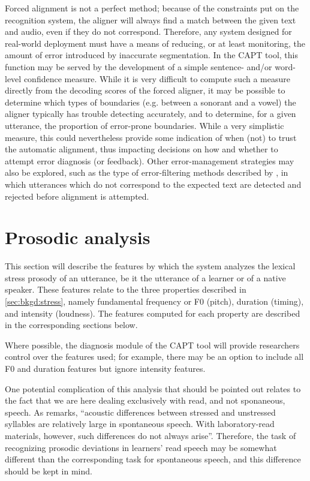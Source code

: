 	Forced alignment is not a perfect method; because of the constraints put on the recognition system, the aligner will always find a match between the given text and audio, even if they do not correspond. Therefore, any system designed for real-world deployment must have a means of reducing, or at least monitoring, the amount of error introduced by inaccurate segmentation. 	
	In the CAPT tool, this function may be served by the development of a simple sentence- and/or word-level confidence measure. 
	While it is very difficult to compute such a measure directly from the decoding scores of the forced aligner, it may be possible to determine which types of boundaries (e.g. between a sonorant and a vowel) the aligner typically has trouble detecting accurately, and to determine, for a given utterance, the proportion of error-prone boundaries. While a very simplistic measure, this could nevertheless provide some indication of when (not) to trust the automatic alignment, thus impacting decisions on how and whether to attempt error diagnosis (or feedback).
	Other error-management strategies may also be explored, such as the type of error-filtering methods described by \textcite{Mesbahi2011,Bonneau2012,Orosanu2012}, in which utterances which do not correspond to the expected text are detected and rejected before alignment is attempted.
	
\section{Prosodic analysis}
\label{sec:diag:prosody}

	This section will describe the features by which the system analyzes the lexical stress prosody of an utterance, be it the utterance of a learner or of a native speaker. These features relate to the three properties described in \cref{sec:bkgd:stress}, namely fundamental frequency or F0 (pitch), duration (timing), and intensity (loudness). The features computed for each property are described in the corresponding sections below.
	
	Where possible, the diagnosis module of the CAPT tool will provide researchers control over the features used; for example, there may be an option to include all F0 and duration features but ignore intensity features.
	
	One potential complication of this analysis that should be pointed out relates to the fact that we are here dealing exclusively with read, and not sponaneous, speech. As \textcite[p.~275]{Cutler2005} remarks, ``acoustic differences between stressed and unstressed syllables are relatively large in spontaneous speech. With laboratory-read materials, however, such differences do not always arise''. Therefore, the task of recognizing prosodic deviations in learners' read speech may be somewhat different than the corresponding task for spontaneous speech, and this difference should be kept in mind. 

